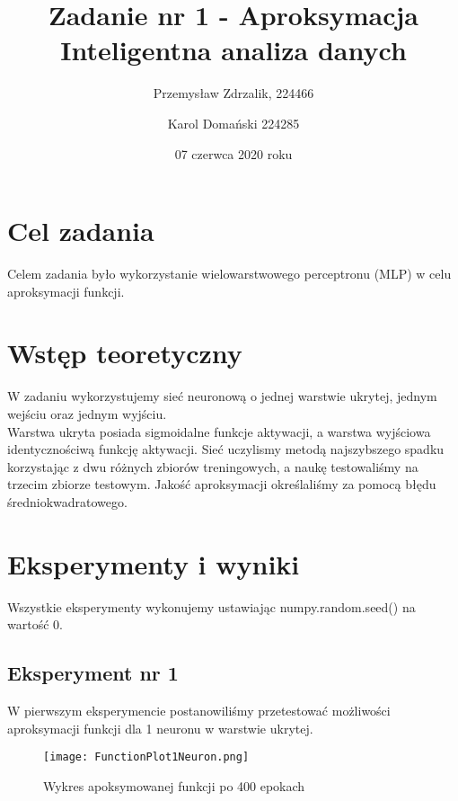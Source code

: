 \documentclass[12pt]{article}
\title{{\bf Zadanie nr 1 - Aproksymacja}\linebreak
Inteligentna analiza danych}
\author{Przemysław Zdrzalik, 224466 \and Karol Domański 224285}
\date{07 czerwca 2020 roku}
\begin{document}
\clearpage\maketitle
\thispagestyle{empty}
\newpage
\setcounter{page}{1}
\section{Cel zadania}

Celem zadania było wykorzystanie wielowarstwowego perceptronu (MLP) w celu aproksymacji funkcji.

\section{Wstęp teoretyczny}

W zadaniu wykorzystujemy sieć neuronową o jednej warstwie ukrytej, jednym wejściu oraz jednym wyjściu. \\ Warstwa ukryta posiada sigmoidalne funkcje aktywacji, a warstwa wyjściowa identycznościwą funkcję aktywacji. Sieć uczylismy metodą najszybszego spadku  korzystając z dwu różnych zbiorów treningowych, a naukę testowaliśmy na trzecim zbiorze testowym.
Jakość aproksymacji określaliśmy za pomocą błędu średniokwadratowego.

\newpage
\section{Eksperymenty i wyniki} 

Wszystkie eksperymenty wykonujemy ustawiając numpy.random.seed() na wartość 0.


\subsection{Eksperyment nr 1}

W pierwszym eksperymencie postanowiliśmy przetestować możliwości\\ 
aproksymacji funkcji dla 1 neuronu w warstwie ukrytej.
\begin{figure}[!htb]
 \centering
 \texttt{[image: FunctionPlot1Neuron.png]}
 \caption{Wykres apoksymowanej funkcji po 400 epokach}
 \vspace{-0.3cm}
 \label{WykresFun1}
\end{figure}
\end{document}
